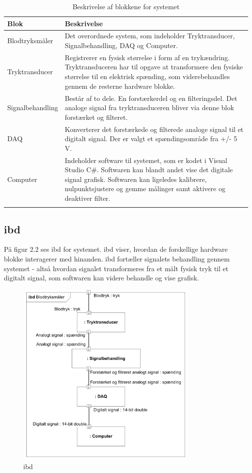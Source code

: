 \begin{longtabu} to 
	\textbf{Blok} &	\textbf{Beskrivelse} \\[-1ex]
	\midrule
	Blodtryksmåler & Det overordnede system, som indeholder Tryktransducer, Signalbehandling, DAQ og Computer.\\[-1ex]
	Tryktransducer & Registrerer en fysisk størrelse i form af en trykændring. Tryktransduceren har til opgave at transformere den fysiske størrelse til en elektrisk spænding, som viderebehandles gennem de resterne hardware blokke.  \\[-1ex]
	Signalbehandling & Består af to dele. En forstærkerdel og en filteringsdel. Det analoge signal fra tryktransduceren bliver via denne blok forstærket og filteret.\\[-1ex]
	DAQ & Konverterer det forstærkede og filterede analoge signal til et digitalt signal. Der er valgt et spændingsområde fra +/- 5 V.\\[-1ex]
	Computer & Indeholder software til systemet, som er kodet i Visual Studio C\#. Softwaren kan blandt andet vise det digitale signal grafisk. Softwaren kan ligeledes kalibrere, nulpunktsjustere og gemme målinger samt aktivere og deaktiver filter.\\[-1ex]
	\caption{Beskrivelse af blokkene for systemet}
	\end{longtabu}
	
\subsection{ibd}
På figur 2.2 ses ibd for systemet. ibd viser, hvordan de forskellige hardware blokke interagerer med hinanden. ibd fortæller signalets behandling gennem systemet - altså hvordan signalet transformeres fra et målt fysisk tryk til et digitalt signal, som softwaren kan videre behandle og vise grafisk. 

\begin{figure}[H]
	\centering
	\includegraphics[width=0.8\textwidth]{Figurer/Snip20151209_72}
	\caption{ibd}
	\label{fig:ibd}
\end{figure}

